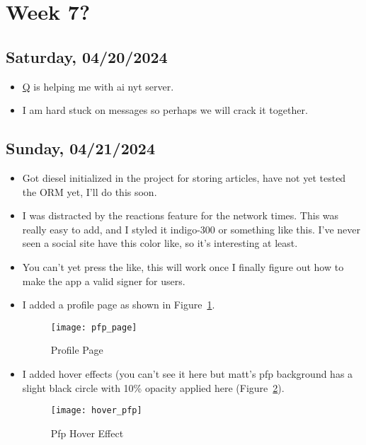 \newpage
\section{Week 7?}
\subsection*{Saturday, 04/20/2024}
\begin{itemize}
    \item \textcolor{blue}{\href{https://github.com/queazyg}{Q}} is helping me with ai nyt server.
    \item I am hard stuck on messages so perhaps we will crack it together.
\end{itemize}

\subsection*{Sunday, 04/21/2024}
\begin{itemize}
    \item Got diesel initialized in the project for storing articles, have not
        yet tested the ORM yet, I'll do this soon. 
    \item I was distracted by the reactions feature for the network times. This
        was really easy to add, and I styled it indigo-300 or something like
        this. I've never seen a social site have this color like, so it's
        interesting at least.
    \item You can't yet press the like, this will work once I finally figure out
        how to make the app a valid signer for users.
    \item I added a profile page as shown in Figure~\ref{fig:pfp_page}.
        \begin{figure}[ht]
            \centering
            \texttt{[image: pfp\_page]}
            \captionsetup{labelfont=bf, textfont=it}
            \caption{Profile Page}
            \label{fig:pfp_page}
        \end{figure}
    \item I added hover effects (you can't see it here but matt's pfp background
        has a slight black circle with 10\% opacity applied here
        (Figure~\ref{fig:hover_pfp}).
        \begin{figure}[ht]
            \centering
            \texttt{[image: hover\_pfp]}
            \captionsetup{labelfont=bf, textfont=it}
            \caption{Pfp Hover Effect}
            \label{fig:hover_pfp}
        \end{figure}

\end{itemize}

